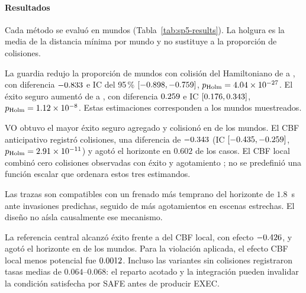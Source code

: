 \paragraph{Resultados}

Cada método se evaluó en \SPFiveRunsPerMethod{} mundos (Tabla~\ref{tab:sp5-results}). La holgura es la media de la distancia mínima por mundo y no sustituye a la proporción de colisiones.

\begin{table}[!htbp]
  \centering
  \caption{Resultados agregados de E5-C. Proporciones sobre 108 mundos pareados por método.}
  \label{tab:sp5-results}
  \scriptsize
  \resizebox{\textwidth}{!}{}
  \viuownsource
\end{table}

La guardia redujo la proporción de mundos con colisión del Hamiltoniano de \SPFiveHamiltonianRawCollision{} a \SPFiveHamiltonianCBFCollision{}, con diferencia \(-0.833{}\) e IC del 95\,\% \([-0.898{},-0.759{}]\), \(p_{\mathrm{Holm}}=4.04\times10^{-27}\). El éxito seguro aumentó de \SPFiveHamiltonianRawSafe{} a \SPFiveHamiltonianCBFSafe{}, con diferencia \(0.259{}\) e IC \([0.176{},0.343{}]\), \(p_{\mathrm{Holm}}=1.12\times10^{-8}\). Estas estimaciones corresponden a los mundos muestreados.

VO obtuvo el mayor éxito seguro agregado y colisionó en \SPFiveVOCollision{} de los mundos. El CBF anticipativo registró \SPFivePreviewCollision{} colisiones, una diferencia de \(-0.343{}\) (IC \([-0.435{},-0.259{}]\), \(p_{\mathrm{Holm}}=2.91\times10^{-11}\)) y agotó el horizonte en \(0.602\) de los casos. El CBF local combinó cero colisiones observadas con éxito \SPFiveLocalCBFSafe{} y agotamiento \SPFiveLocalCBFTimeout{}; no se predefinió una función escalar que ordenara estos tres estimandos.

Las trazas son compatibles con un frenado más temprano del horizonte de $1.8$~s ante invasiones predichas, seguido de más agotamientos en escenas estrechas. El diseño no aísla causalmente ese mecanismo.

La referencia central alcanzó éxito \SPFiveCentralSafe{} frente a \SPFiveLocalCBFSafe{} del CBF local, con efecto \(-0.426{}\), y agotó el horizonte en \SPFiveCentralTimeout{} de los mundos. Para la violación aplicada, el efecto CBF local menos potencial fue \(0.0012{}\). Incluso las variantes sin colisiones registraron tasas medias de \(0.064\)--\(0.068\): el reparto acotado y la integración pueden invalidar la condición satisfecha por SAFE antes de producir EXEC.

